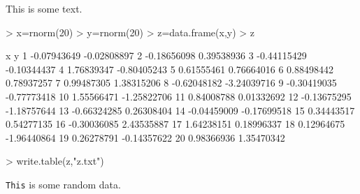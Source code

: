 This is some text.

\begin{Schunk}
\begin{Sinput}
> x=rnorm(20)
> y=rnorm(20)
> z=data.frame(x,y)
> z
\end{Sinput}
\begin{Soutput}
             x           y
1  -0.07943649 -0.02808897
2  -0.18656098  0.39538936
3  -0.44115429 -0.10344437
4   1.76839347 -0.80405243
5   0.61555461  0.76664016
6   0.88498442  0.78937257
7   0.99487305  1.38315206
8  -0.62048182 -3.24039716
9  -0.30419035 -0.77773418
10  1.55566471 -1.25822706
11  0.84008788  0.01332692
12 -0.13675295 -1.18757644
13 -0.66324285  0.26308404
14 -0.04459009 -0.17699518
15  0.34443517  0.54277135
16 -0.30036085  2.43535887
17  1.64238151  0.18996337
18  0.12964675 -1.96440864
19  0.26278791 -0.14357622
20  0.98366936  1.35470342
\end{Soutput}
\begin{Sinput}
> write.table(z,"z.txt")
\end{Sinput}
\end{Schunk}


\texttt{This} is some random data.

